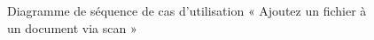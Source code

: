 \begin{figure}[H]
  \centering
  \caption{Diagramme de séquence de cas d'utilisation « Ajoutez un fichier à un document via scan  »}
  \label{fig:sequence_add_scan_file}
\end{figure}
